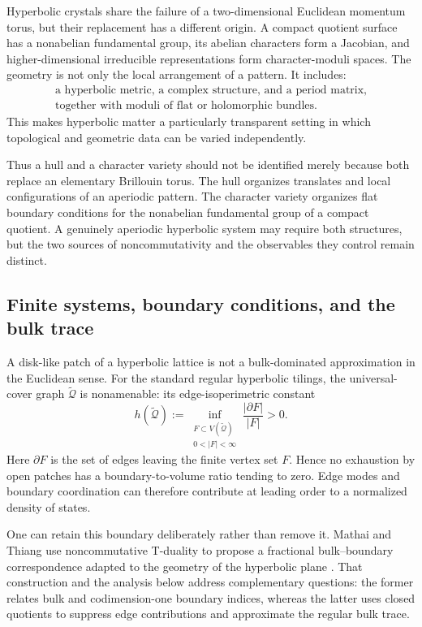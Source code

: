 \documentclass[11pt]{article}
\theoremstyle{definition}
\theoremstyle{remark}
\begin{document}
Hyperbolic crystals share the failure of a two-dimensional Euclidean momentum
torus, but their replacement has a different origin.  A compact quotient
surface has a nonabelian fundamental group, its abelian characters form a
Jacobian, and higher-dimensional irreducible representations form
character-moduli spaces.  The geometry is not only the local arrangement of a
pattern.  It includes:
\[
\begin{gathered}
 \text{a hyperbolic metric, a complex structure, and a period matrix,}\\
 \text{together with moduli of flat or holomorphic bundles}.
\end{gathered}
\]
This makes hyperbolic matter a particularly transparent setting in which
topological and geometric data can be varied independently.

Thus a hull and a character variety should not be identified merely because
both replace an elementary Brillouin torus.  The hull organizes translates
and local configurations of an aperiodic pattern.  The character variety
organizes flat boundary conditions for the nonabelian fundamental group of a
compact quotient.  A genuinely aperiodic hyperbolic system may require both
structures, but the two sources of noncommutativity and the observables they
control remain distinct.

\subsection{Finite systems, boundary conditions, and the bulk trace}
\label{sec:finite-boundaries}

A disk-like patch of a hyperbolic lattice is not a bulk-dominated
approximation in the Euclidean sense.  For the standard regular hyperbolic
tilings, the universal-cover graph \(\widetilde{\mathcal Q}\) is
nonamenable: its edge-isoperimetric constant
\[
 h(\widetilde{\mathcal Q})
   :=\inf_{\substack{F\subset V(\widetilde{\mathcal Q})\\
                     0<|F|<\infty}}
       \frac{|\partial F|}{|F|}
   >0.
 \tag{10.2}\label{eq:hyperbolic-cheeger}
\]
Here \(\partial F\) is the set of edges leaving the finite vertex set \(F\).
Hence no exhaustion by open patches has a boundary-to-volume ratio tending
to zero.  Edge modes and boundary coordination can therefore contribute at
leading order to a normalized density of states.

One can retain this boundary deliberately rather than remove it.  Mathai and
Thiang use noncommutative T-duality to propose a fractional bulk--boundary
correspondence adapted to the geometry of the hyperbolic plane
\cite{MathaiThiang2019}.  That construction and the analysis below address
complementary questions: the former relates bulk and codimension-one boundary
indices, whereas the latter uses closed quotients to suppress edge
contributions and approximate the regular bulk trace.
\end{document}
